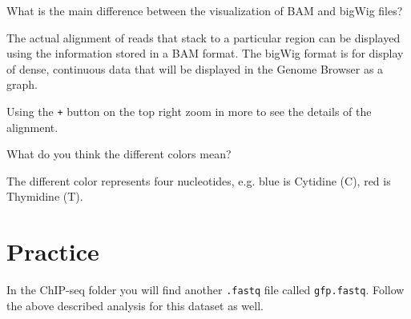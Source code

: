 \begin{questions}
What is the main difference between the visualization of BAM and bigWig files?
\begin{answer}
The actual alignment of reads that stack to a particular region can be displayed
using the information stored in a BAM format.
The bigWig format is for display of dense, continuous data that will be
displayed in the Genome Browser as a graph.
\end{answer}
\end{questions}

Using the \texttt{+} button on the top right zoom in more to see the details of the alignment.

\begin{questions}
What do you think the different colors mean?
\begin{answer}
The different color represents four nucleotides, e.g. blue is Cytidine (C), red
is Thymidine (T).
\end{answer}
\end{questions}

\section{Practice}
In the ChIP-seq folder you will find another \texttt{.fastq} file called
\texttt{gfp.fastq}. Follow the above described analysis for this dataset as well.

